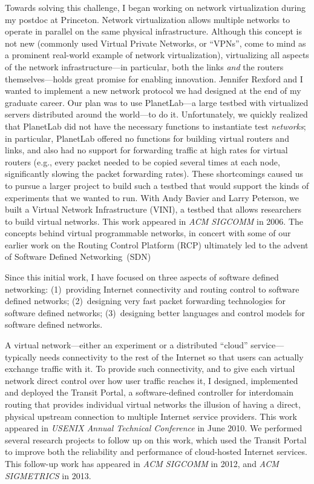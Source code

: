 Towards solving this challenge, I began working on network
virtualization during my postdoc at Princeton.  Network virtualization
allows multiple networks to operate in parallel on the same physical
infrastructure.  Although this concept is not new (commonly used Virtual
Private Networks, or ``VPNs'', come to mind as a prominent real-world
example of network virtualization), virtualizing all aspects of the
network infrastructure---in particular, both the links {\em and} the
routers themselves---holds great promise for enabling innovation.
Jennifer Rexford and I wanted to implement a new network protocol we had
designed at the end of my graduate career. Our plan was to use
PlanetLab---a large testbed with virtualized servers distributed around
the world---to do it.  Unfortunately, we quickly realized that PlanetLab
did not have the necessary functions to instantiate test {\em networks};
in particular, PlanetLab offered no functions for building virtual
routers and links, and also had no support for forwarding traffic at
high rates for virtual routers (e.g., every packet needed to be copied
several times at each node, significantly slowing the packet forwarding
rates).  These shortcomings caused us to pursue a larger project to
build such a testbed that would support the kinds of experiments that we
wanted to run.  With Andy Bavier and Larry Peterson, we built a Virtual
Network Infrastructure (VINI), a testbed that allows researchers to
build virtual networks.  This work appeared in {\em ACM SIGCOMM} in
2006.  The concepts behind virtual programmable networks, in concert
with some of our earlier work on the Routing Control Platform (RCP)
ultimately led to the advent of Software Defined Networking~(SDN)

Since this initial work, I have focused on three aspects of software
defined networking: (1)~providing Internet connectivity and routing
control to software defined networks; (2)~designing very fast packet forwarding
technologies for software defined networks; (3)~designing better
languages and control models for software defined networks.

A virtual network---either an experiment or a distributed ``cloud''
service---typically needs connectivity to the rest of the Internet so
that users can actually exchange traffic with it.  To provide such
connectivity, and to give each virtual network direct control over how
user traffic reaches it, I designed, implemented and deployed the
Transit Portal, a software-defined controller for interdomain routing
that provides individual virtual networks the illusion of having a
direct, physical upstream connection to multiple Internet service
providers.  This work appeared in {\em USENIX Annual Technical
Conference} in June 2010.  We performed several research projects to
follow up on this work, which used the Transit Portal to improve both
the reliability and performance of cloud-hosted Internet services.  This
follow-up work has appeared in {\em ACM SIGCOMM} in 2012, and {\em ACM
SIGMETRICS} in 2013.

